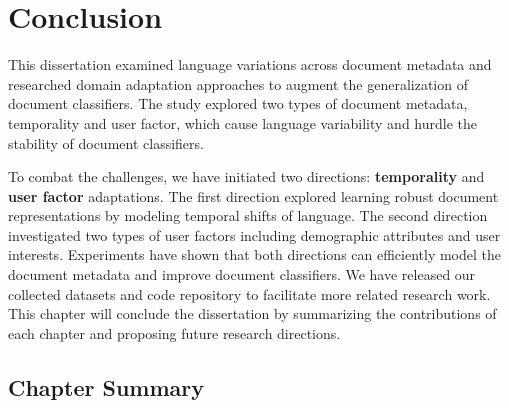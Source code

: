 \chapter{Conclusion}
\label{chp:conclusion}

This dissertation examined language variations across document metadata and researched domain adaptation approaches to augment the generalization of document classifiers.
The study explored two types of document metadata, temporality and user factor, which cause language variability and hurdle the stability of document classifiers.

To combat the challenges, we have initiated two directions: \textbf{temporality} and \textbf{user factor} adaptations.
The first direction explored learning robust document representations by modeling temporal shifts of language.
The second direction investigated two types of user factors including demographic attributes and user interests.
Experiments have shown that both directions can efficiently model the document metadata and improve document classifiers.
We have released our collected datasets and code repository to facilitate more related research work.
This chapter will conclude the dissertation by summarizing the contributions of each chapter and proposing future research directions.

\section{Chapter Summary}


